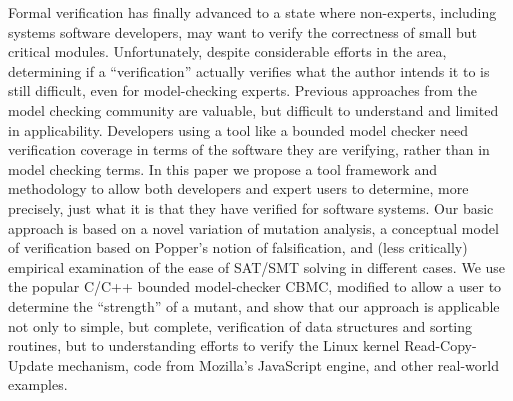 Formal verification has finally advanced to a state where non-experts, including systems software developers, may want to verify the correctness of small but critical modules.  Unfortunately, despite considerable efforts in the area, determining if a ``verification'' actually verifies what the author intends it to is still difficult, even for model-checking experts.  Previous approaches from the model checking community are valuable, but difficult to understand and limited in applicability.  Developers using a tool like a bounded model checker need verification coverage in terms of the software they are verifying, rather than in model checking terms.  In this paper we propose a tool framework and methodology to allow both developers and expert users to determine, more precisely, just what it is that they have verified for software systems.  Our basic approach is based on a novel variation of mutation analysis, a conceptual model of verification based on Popper's notion of falsification, and (less critically) empirical examination of the ease of SAT/SMT solving in different cases.  We use the popular C/C++ bounded model-checker CBMC, modified to allow a user to determine the ``strength'' of a mutant, and show that our approach is applicable not only to simple, but complete, verification of data structures and sorting routines, but to understanding efforts to verify the Linux kernel Read-Copy-Update mechanism, code from Mozilla's JavaScript engine, and other real-world examples.
